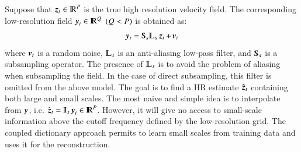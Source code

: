 Suppose that $ \operatorname{\boldsymbol{z}}_t \in {\rm I\!R}^{P}$ is the true high resolution velocity field. The corresponding low-resolution field $ \operatorname{\boldsymbol{y}}_t \in {\rm I\!R}^{Q} $ $(Q < P) $ is obtained as:
\begin{equation}
\y_t = \Sub_s\LPF_s\z_t + \mybold{v}_t
\label{eq:DL_approach1}
\end{equation}
where $ \operatorname{\boldsymbol{v}}_t $ is a random noise, $ \LPF_s $ is an anti-aliasing low-pass filter, and $ \Sub_s $ is a subsampling operator. The presence of $ \LPF_s $ is to avoid the problem of aliasing when subsampling the field. In the case of direct subsampling, this filter is omitted from the above model. The goal is to find a HR estimate $ \hat{\operatorname{\boldsymbol{z}}}_t $ containing both large and small scales. The most naive and simple idea is to interpolate from $ \operatorname{\boldsymbol{y}} $, i.e. $ \hat{\z}_t = \Interp_s\y_t \in \R^{\dimsh}$. However, it will give no access to small-scale information above the cutoff frequency defined by the low-resolution grid. The coupled dictionary approach permits to learn small scales from training data and uses it for the reconstruction. 

